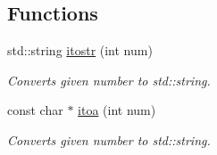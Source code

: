 \subsection*{Functions}
\begin{DoxyCompactItemize}
\item 
std::string \hyperlink{namespaceChEngn_a5d21d3814a89e92e086273036613ce2f}{itostr} (int num)
\begin{DoxyCompactList}\small\item\em Converts given number to std::string. \item\end{DoxyCompactList}\item 
const char $\ast$ \hyperlink{namespaceChEngn_ade01056f903a4bcf3606ca380be66d0a}{itoa} (int num)
\begin{DoxyCompactList}\small\item\em Converts given number to std::string. \item\end{DoxyCompactList}\end{DoxyCompactItemize}

